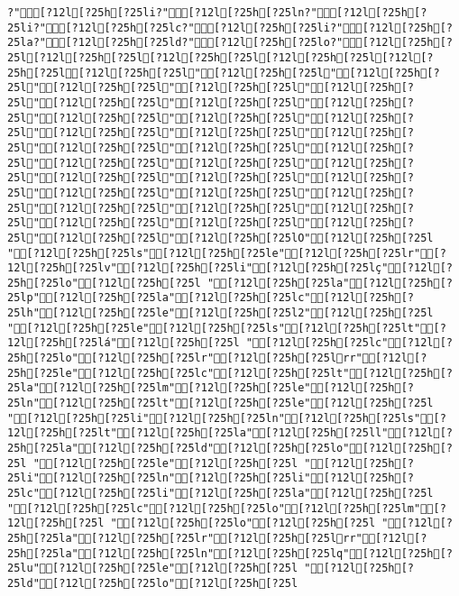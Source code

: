 \documentclass{scrartcl}
\begin{document}
\begin{Verbatim}
?"[?12l[?25h[?25li?"[?12l[?25h[?25ln?"[?12l[?25h[?25li?"[?12l[?25h[?25lc?"[?12l[?25h[?25li?"[?12l[?25h[?25la?"[?12l[?25h[?25ld?"[?12l[?25h[?25lo?"[?12l[?25h[?25l[?12l[?25h[?25l[?12l[?25h[?25l[?12l[?25h[?25l[?12l[?25h[?25l[?12l[?25h[?25l"[?12l[?25h[?25l"[?12l[?25h[?25l"[?12l[?25h[?25l"[?12l[?25h[?25l"[?12l[?25h[?25l"[?12l[?25h[?25l"[?12l[?25h[?25l"[?12l[?25h[?25l"[?12l[?25h[?25l"[?12l[?25h[?25l"[?12l[?25h[?25l"[?12l[?25h[?25l"[?12l[?25h[?25l"[?12l[?25h[?25l"[?12l[?25h[?25l"[?12l[?25h[?25l"[?12l[?25h[?25l"[?12l[?25h[?25l"[?12l[?25h[?25l"[?12l[?25h[?25l"[?12l[?25h[?25l"[?12l[?25h[?25l"[?12l[?25h[?25l"[?12l[?25h[?25l"[?12l[?25h[?25l"[?12l[?25h[?25l"[?12l[?25h[?25l"[?12l[?25h[?25l"[?12l[?25h[?25l"[?12l[?25h[?25l"[?12l[?25h[?25l"[?12l[?25h[?25l"[?12l[?25h[?25l"[?12l[?25h[?25lO"[?12l[?25h[?25l "[?12l[?25h[?25ls"[?12l[?25h[?25le"[?12l[?25h[?25lr"[?12l[?25h[?25lv"[?12l[?25h[?25li"[?12l[?25h[?25lç"[?12l[?25h[?25lo"[?12l[?25h[?25l "[?12l[?25h[?25la"[?12l[?25h[?25lp"[?12l[?25h[?25la"[?12l[?25h[?25lc"[?12l[?25h[?25lh"[?12l[?25h[?25le"[?12l[?25h[?25l2"[?12l[?25h[?25l "[?12l[?25h[?25le"[?12l[?25h[?25ls"[?12l[?25h[?25lt"[?12l[?25h[?25lá"[?12l[?25h[?25l "[?12l[?25h[?25lc"[?12l[?25h[?25lo"[?12l[?25h[?25lr"[?12l[?25h[?25lrr"[?12l[?25h[?25le"[?12l[?25h[?25lc"[?12l[?25h[?25lt"[?12l[?25h[?25la"[?12l[?25h[?25lm"[?12l[?25h[?25le"[?12l[?25h[?25ln"[?12l[?25h[?25lt"[?12l[?25h[?25le"[?12l[?25h[?25l "[?12l[?25h[?25li"[?12l[?25h[?25ln"[?12l[?25h[?25ls"[?12l[?25h[?25lt"[?12l[?25h[?25la"[?12l[?25h[?25ll"[?12l[?25h[?25la"[?12l[?25h[?25ld"[?12l[?25h[?25lo"[?12l[?25h[?25l "[?12l[?25h[?25le"[?12l[?25h[?25l "[?12l[?25h[?25li"[?12l[?25h[?25ln"[?12l[?25h[?25li"[?12l[?25h[?25lc"[?12l[?25h[?25li"[?12l[?25h[?25la"[?12l[?25h[?25l "[?12l[?25h[?25lc"[?12l[?25h[?25lo"[?12l[?25h[?25lm"[?12l[?25h[?25l "[?12l[?25h[?25lo"[?12l[?25h[?25l "[?12l[?25h[?25la"[?12l[?25h[?25lr"[?12l[?25h[?25lrr"[?12l[?25h[?25la"[?12l[?25h[?25ln"[?12l[?25h[?25lq"[?12l[?25h[?25lu"[?12l[?25h[?25le"[?12l[?25h[?25l "[?12l[?25h[?25ld"[?12l[?25h[?25lo"[?12l[?25h[?25l 
\end{Verbatim}
\end{document}

